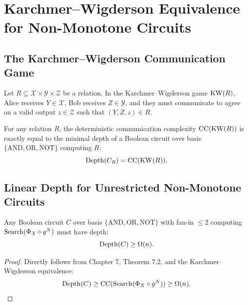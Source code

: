 \chapter{Karchmer--Wigderson Equivalence for Non-Monotone Circuits}

\section{The Karchmer--Wigderson Communication Game}
Let $R \subseteq \mathcal{X} \times \mathcal{Y} \times \mathcal{Z}$ be a relation. In the Karchmer--Wigderson game $\mathrm{KW}(R)$, Alice receives $Y \in \mathcal{X}$, Bob receives $Z \in \mathcal{Y}$, and they must communicate to agree on a valid output $z \in \mathcal{Z}$ such that $(Y, Z, z) \in R$.

\begin{theorem}
For any relation $R$, the deterministic communication complexity $\mathrm{CC}(\mathrm{KW}(R))$ is exactly equal to the minimal depth of a Boolean circuit over basis $\{\mathrm{AND}, \mathrm{OR}, \mathrm{NOT}\}$ computing $R$:
\[
\mathrm{Depth}(C_R) = \mathrm{CC}(\mathrm{KW}(R)).
\]
\end{theorem}

\section{Linear Depth for Unrestricted Non-Monotone Circuits}
\begin{theorem}
Any Boolean circuit $C$ over basis $\{\mathrm{AND}, \mathrm{OR}, \mathrm{NOT}\}$ with fan-in $\le 2$ computing $\mathrm{Search}(\Phi_X \circ g^N)$ must have depth:
\[
\mathrm{Depth}(C) \ge \Omega(n).
\]
\end{theorem}

\begin{proof}
Directly follows from Chapter 7, Theorem 7.2, and the Karchmer--Wigderson equivalence:
\[
\mathrm{Depth}(C) \ge \mathrm{CC}(\mathrm{Search}(\Phi_X \circ g^N)) \ge \Omega(n).
\]
\end{proof}
